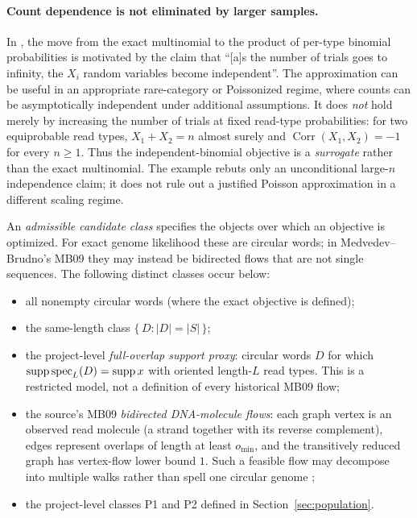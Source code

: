 \paragraph{Count dependence is not eliminated by larger samples.}
In \parencite[\S6.1]{medvedev2009}, the move from the exact multinomial
to the product of per-type binomial probabilities is motivated by the claim
that ``[a]s the number of trials goes to infinity, the $X_i$ random variables
become independent''.
The approximation can be useful in an appropriate rare-category
or Poissonized regime, where counts can be asymptotically
independent under additional assumptions. It does
\emph{not} hold merely by increasing the number of trials at
fixed read-type probabilities:
for two equiprobable read types, $X_1+X_2=n$ almost surely and
$\operatorname{Corr}(X_1,X_2)=-1$ for every $n\ge1$.
Thus the independent-binomial objective is a
\emph{surrogate} rather than the exact multinomial.
The example rebuts only an unconditional large-$n$
independence claim; it does not rule out a justified
Poisson approximation in a different scaling regime.


An \emph{admissible candidate class} specifies the objects over which an
objective is optimized. For exact genome likelihood these are circular words;
in Medvedev--Brudno's MB09 they may instead be bidirected flows that
are not single sequences. The following distinct classes occur below:
\begin{itemize}[leftmargin=*]
  \item all nonempty circular words (where the exact objective is defined);
  \item the same-length class $\{\,D : |D|=|S|\,\}$;
  \item the project-level \emph{full-overlap support proxy}: circular words
        $D$ for which $\operatorname{supp}\operatorname{spec}_L(D)=\operatorname{supp} x$ with oriented length-$L$
        read types. This is a restricted model, not a definition of every
        historical MB09 flow;
  \item the source's MB09 \emph{bidirected DNA-molecule flows}:
        each graph vertex is an observed read molecule (a strand together
        with its reverse complement), edges represent overlaps of length
        at least $o_{\min}$, and the transitively reduced graph has
        vertex-flow lower bound $1$. Such a feasible flow may decompose
        into multiple walks rather than spell one circular genome
        \parencite[\S6.2]{medvedev2009};
  \item the project-level classes P1 and P2 defined in
        Section~\ref{sec:population}.
\end{itemize}

